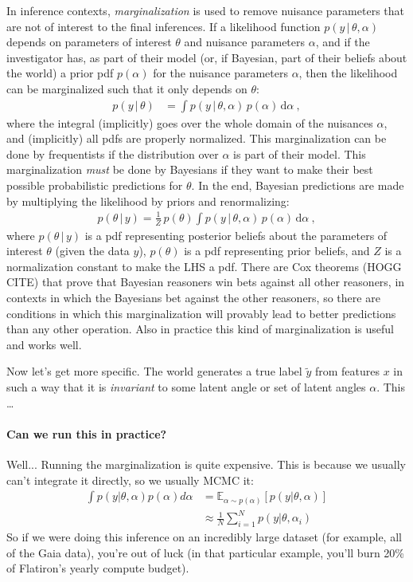 \documentclass{article}
\newcommand{\dd}{\mathrm{d}}
\newcommand{\given}{\,|\,}
\begin{document}
In inference contexts, \emph{marginalization} is used to remove nuisance parameters that are not of interest to the final inferences.
If a likelihood function $p(y\given\theta,\alpha)$ depends on parameters of interest $\theta$ and nuisance parameters $\alpha$, and if the investigator has, as part of their model (or, if Bayesian, part of their beliefs about the world) a prior pdf $p(\alpha)$ for the nuisance parameters $\alpha$, then the likelihood can be marginalized such that it only depends on $\theta$:
\begin{align}
    p(y\given\theta) &= \int p(y\given\theta,\alpha)\,p(\alpha)\,\dd\alpha ~,
\end{align}
where the integral (implicitly) goes over the whole domain of the nuisances $\alpha$, and (implicitly) all pdfs are properly normalized.
This marginalization can be done by frequentists if the distribution over $\alpha$ is part of their model.
This marginalization \emph{must} be done by Bayesians if they want to make their best possible probabilistic predictions for $\theta$.
In the end, Bayesian predictions are made by multiplying the likelihood by priors and renormalizing:
\begin{align}
    p(\theta\given y) = \frac{1}{Z}\,p(\theta)\int p(y\given\theta,\alpha)\,p(\alpha)\,\dd\alpha ~,
\end{align}
where $p(\theta\given y)$ is a pdf representing posterior beliefs about the parameters of interest $\theta$ (given the data $y$),
$p(\theta)$ is a pdf representing prior beliefs,
and $Z$ is a normalization constant to make the LHS a pdf.
There are Cox theorems (HOGG CITE) that prove that Bayesian reasoners win bets against all other reasoners, in contexts in which the Bayesians bet against the other reasoners, so there are conditions in which this marginalization will provably lead to better predictions than any other operation.
Also in practice this kind of marginalization is useful and works well.

Now let's get more specific.
The world generates a true label $\tilde{y}$ from features $x$ in such a way that it is \emph{invariant} to some latent angle or set of latent angles $\alpha$.
This \ldots

\paragraph{Can we run this in practice?}
Well... Running the marginalization is quite expensive. This is because we usually can't integrate it directly, so we usually MCMC it:
\begin{align}
	\int p(y | \theta, \alpha) p(\alpha) d\alpha & = \mathbb E_{\alpha \sim p(\alpha)}[p(y|\theta, \alpha)] \\
	& \approx \frac{1}{N} \sum_{i=1}^N p(y|\theta, \alpha_i)
\end{align}
So if we were doing this inference on an incredibly large dataset (for example, all of the Gaia data), you're out of luck (in that particular example, you'll burn 20\% of Flatiron's yearly compute budget). 
\end{document}
